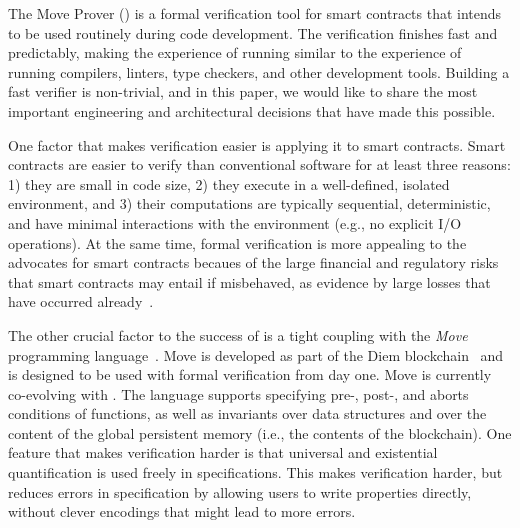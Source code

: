 
The Move Prover (\MVP) is a formal verification tool for smart contracts
that intends to be used routinely during code development.
%
The verification finishes fast and predictably,
making the experience of running \MVP similar to the experience of
running compilers, linters, type checkers, and other development tools.
%
Building a fast verifier is non-trivial, and in this paper,
we would like to share the most important engineering and architectural
decisions that have made this possible.

One factor that makes verification easier is applying it to smart contracts.
%
Smart contracts are easier to verify than conventional software for at least
three reasons:
1) they are small in code size,
2) they execute in a well-defined, isolated environment, and
3) their computations are typically sequential, deterministic, and have
   minimal interactions with the environment
   (e.g., no explicit I/O operations).
%
At the same time,
formal verification is more appealing to the advocates for smart contracts
becaues of the large financial and regulatory risks that smart contracts may
entail if misbehaved,
as evidence by large losses that have occurred already~\cite{???}.



The other crucial factor to the success of \MVP is a tight coupling with
the \emph{Move} programming language~\cite{MOVE_LANG}.
%
Move is developed as part of the Diem blockchain~\cite{DIEM} and
is designed to be used with formal verification from day one.
%
Move is currently co-evolving with \MVP.
%
The language supports specifying
pre-, post-, and aborts conditions of functions,
as well as invariants
over data structures and
over the content of the global persistent memory
(i.e., the contents of the blockchain).
%
One feature that makes verification harder is that universal and existential
quantification is used freely in specifications. This makes verification harder,
but reduces errors in specification by allowing users to write properties directly,
without clever encodings that might lead to more errors.

